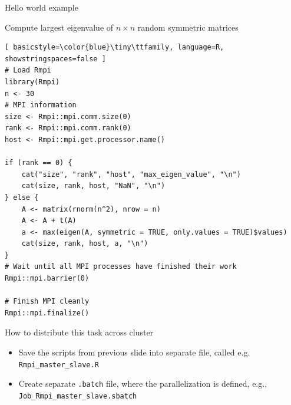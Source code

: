 \documentclass[compress,xcolor=table]{beamer}
\begin{document}
	
\begin{frame}[fragile]{Hello world example} 
	\hfill \href{https://github.com/janezpovh/parallel-R-nov-26/blob/main/code/Rmpi_master_slave.R} {
		} 
		\vspace{-1mm} \begin{block} 
			{Compute largest eigenvalue of $n\times n$ random symmetric matrices} 
			\tiny \begin{lstlisting}[ basicstyle=\color{blue}\tiny\ttfamily, language=R, showstringspaces=false ] 
# Load Rmpi
library(Rmpi)
n <- 30
# MPI information
size <- Rmpi::mpi.comm.size(0)
rank <- Rmpi::mpi.comm.rank(0)
host <- Rmpi::mpi.get.processor.name()

if (rank == 0) {
	cat("size", "rank", "host", "max_eigen_value", "\n")
	cat(size, rank, host, "NaN", "\n")	
} else {
	A <- matrix(rnorm(n^2), nrow = n)
	A <- A + t(A)
	a <- max(eigen(A, symmetric = TRUE, only.values = TRUE)$values)
	cat(size, rank, host, a, "\n")
}
# Wait until all MPI processes have finished their work
Rmpi::mpi.barrier(0)

# Finish MPI cleanly
Rmpi::mpi.finalize()			
\end{lstlisting} 
		\end{block} 
\end{frame}


	
	\begin{frame}[fragile]{How to distribute this task across cluster}
		\begin{itemize}
			\item Save the scripts from previous slide into separate file, called e.g. \verb|Rmpi_master_slave.R|
			\item  Create separate \verb|.batch| file, where the parallelization is defined, e.g., 
			\verb|Job_Rmpi_master_slave.sbatch|
		\end{itemize}
	\end{frame}
	
\end{document}
